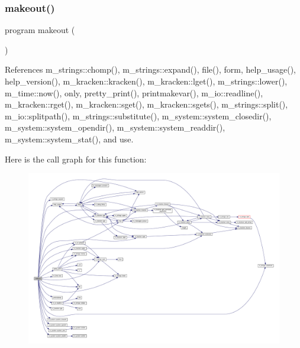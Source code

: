\subsubsection{\texorpdfstring{makeout()}{makeout()}}
{\footnotesize\ttfamily program makeout (\begin{DoxyParamCaption}{ }\end{DoxyParamCaption})}



References m\+\_\+strings\+::chomp(), m\+\_\+strings\+::expand(), file(), form, help\+\_\+usage(), help\+\_\+version(), m\+\_\+kracken\+::kracken(), m\+\_\+kracken\+::lget(), m\+\_\+strings\+::lower(), m\+\_\+time\+::now(), only, pretty\+\_\+print(), printmakevar(), m\+\_\+io\+::readline(), m\+\_\+kracken\+::rget(), m\+\_\+kracken\+::sget(), m\+\_\+kracken\+::sgets(), m\+\_\+strings\+::split(), m\+\_\+io\+::splitpath(), m\+\_\+strings\+::substitute(), m\+\_\+system\+::system\+\_\+closedir(), m\+\_\+system\+::system\+\_\+opendir(), m\+\_\+system\+::system\+\_\+readdir(), m\+\_\+system\+::system\+\_\+stat(), and use.

Here is the call graph for this function\+:
\nopagebreak
\begin{figure}[H]
\begin{center}
\leavevmode
\includegraphics[width=350pt]{makeout_8f90_affb61c1ee20c534b741b72ed67c9c778_cgraph}
\end{center}
\end{figure}
\mbox{\label{makeout_8f90_a19d72934b25646092ee224d98550892a}} 
